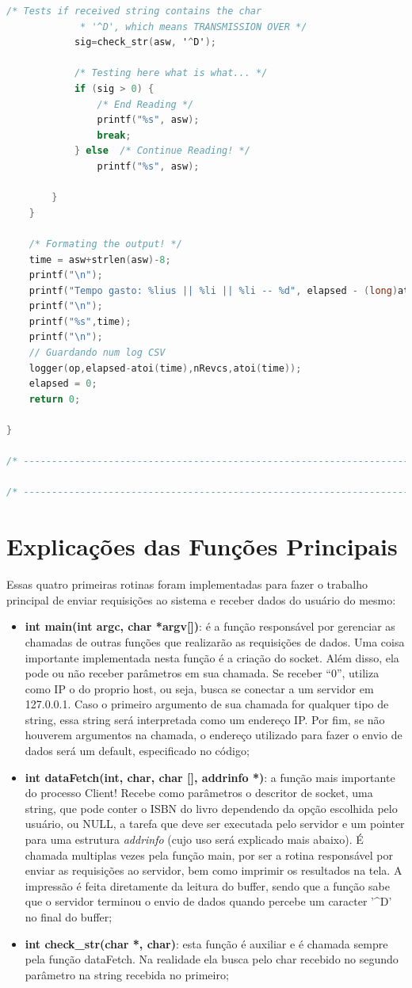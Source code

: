 \documentclass[10pt,a4paper]{report}
\begin{document}
\begin{lstlisting}[language=C]
			/* Tests if received string contains the char
			 * '^D', which means TRANSMISSION OVER */
			sig=check_str(asw, '^D');

			/* Testing here what is what... */
			if (sig > 0) {
				/* End Reading */
				printf("%s", asw);
				break;
			} else  /* Continue Reading! */
				printf("%s", asw);

		}
	}

	/* Formating the output! */
	time = asw+strlen(asw)-8;
	printf("\n");
	printf("Tempo gasto: %lius || %li || %li -- %d", elapsed - (long)atoi(time), elapsed, (long)atoi(time), nRevcs);
	printf("\n");
	printf("%s",time);
	printf("\n");
	// Guardando num log CSV
	logger(op,elapsed-atoi(time),nRevcs,atoi(time));
	elapsed = 0;
	return 0;
	
}

/* -------------------------------------------------------------------------- */

/* -------------------------------------------------------------------------- */
\end{lstlisting}

\section{Explicações das Funções Principais}
Essas quatro primeiras rotinas foram implementadas para fazer o trabalho principal de enviar requisições ao sistema e receber dados do usuário do mesmo:
\begin{itemize}
\item \textbf{int main(int argc, char *argv[])}: é a função responsável por gerenciar as chamadas de outras funções que realizarão as requisições de dados. Uma coisa importante implementada nesta função é a criação do socket. Além disso, ela pode ou não receber parâmetros em sua chamada. Se receber “0”, utiliza como IP o do proprio host, ou seja, busca se conectar a um servidor em 127.0.0.1. Caso o primeiro argumento de sua chamada for qualquer tipo de string, essa string será interpretada como um endereço IP. Por fim, se não houverem argumentos na chamada, o endereço utilizado para fazer o envio de dados será um default, especificado no código;
\item \textbf{int dataFetch(int, char, char [], addrinfo \**)}: a função mais importante do processo Client! Recebe como parâmetros o descritor de socket,  uma string, que pode conter o ISBN do livro dependendo da opção escolhida pelo usuário, ou NULL, a tarefa que deve ser executada pelo servidor e um pointer para uma estrutura \textit{addrinfo} (cujo uso será explicado mais abaixo). É chamada multiplas vezes pela função main, por ser a rotina responsável por enviar as requisições ao servidor, bem como imprimir os resultados na tela. A impressão é feita diretamente da leitura do buffer, sendo que a função sabe que o servidor terminou o envio de dados quando percebe um caracter '\^{}D' no final do buffer;
\item \textbf{int check\_str(char *, char)}: esta função é auxiliar e é chamada sempre pela função dataFetch. Na realidade ela busca pelo char recebido no segundo parâmetro na string recebida no primeiro;
\end{itemize}
\end{document}
